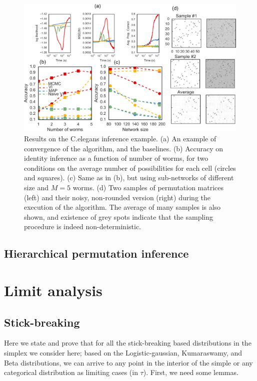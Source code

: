 \begin{figure}[t]
  \centering
  \includegraphics[width=5.in]{../figures/figure7.pdf} 
  \caption{Results on the C.elegans inference example. (a) An example of convergence of the algorithm, and the baselines. (b) Accuracy on identity inference as a function of number of worms, for two conditions on the average number of possibilities for each cell (circles and squares). (c) Same as in (b), but using sub-networks of different size and $M=5$ worms. (d) Two samples of permutation matrices (left) and their noisy, non-rounded version (right) during the execution of the algorithm. The average of many samples is also shown, and existence of grey spots indicate that the sampling procedure is indeed non-deterministic.}
\label{fig:transforms}
\end{figure}

\label{sec:vae}

\subsection{Hierarchical permutation inference}
\label{sec:synth_celegans}





\appendix
\section{Limit analysis}
\subsection{Stick-breaking}
Here we state and prove that for all the stick-breaking based distributions in the simplex we consider here; based on the Logistic-gaussian, Kumaraswamy, and Beta distributions, we can arrive to any point in the interior of the simple or any categorical distribution as limiting cases (in $\tau$). First, we need some lemmas.


